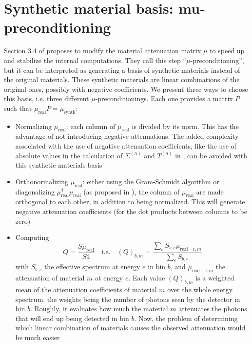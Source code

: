 \documentclass[a4paper, 10pt]{article}
\begin{document}
\section{Synthetic material basis: mu-preconditioning}
\label{sec:mu}
Section 3.4 of \cite{barber_algorithm_2016} proposes to modify the material attenuation matrix $\mu$ to speed up and stabilize the internal computations.
They call this step ``$\mu$-preconditioning'', but it can be interpreted as generating a basis of synthetic materials instead of the original materials.
These synthetic materials are linear combinations of the original ones, possibly with negative coefficients. We present three ways to choose this basis, i.e.
three different $\mu$-preconditionings. Each one provides a matrix $P$ such that $ \mu_{\text{real}} P = \mu_{\text{synth}}$:
\begin{itemize}
 \item Normalizing $\mu_{\text{real}}$: each column of $\mu_{\text{real}}$ is divided by its norm. This has the advantage of not introducing negative attenuations. 
 The added complexity associated with the use of negative attenuation coefficients, like the use of absolute values in the calculation of 
 $\Sigma^{(n)}$ and $T^{(n)}$ in \cite{barber_algorithm_2016}, can be avoided with this synthetic materials basis
 \item Orthonormalizing $\mu_{\text{real}}$: either using the Gram-Schmidt algorithm or diagonalizing $\mu_{\text{real}}^T \mu_{\text{real}}$ (as proposed in \cite{barber_algorithm_2016}), the column of $\mu_{\text{real}}$ are made 
 orthogonal to each other, in addition to being normalized. This will generate negative attenuation coefficients (for the dot products between columns to be zero)
 \item Computing
 \begin{equation*}
  Q = \frac{S \mu_{\text{real}}}{S \mathds{1}} \quad \text{i.e.} \quad \left( Q \right)_{b,m} = \frac{\sum_e S_{b,e} \mu_{\text{real} \quad e,m}}{\sum_e S_{b,e}}
 \end{equation*}
with $S_{b,e}$ the effective spectrum at energy $e$ in bin $b$, and $\mu_{\text{real} \quad e,m}$ the attenuation of material $m$ at energy $e$.
Each value $\left( Q \right)_{b,m} $ is a weighted mean of the attenuation coefficients of material $m$ over the whole energy spectrum, 
the weights being the number of photons seen by the detector in bin $b$. Roughly, it evaluates how much the material $m$ attenuates
the photons that will end up being detected in bin $b$. 
Now, the problem of determining which linear combination of materials causes the observed attenuation would be much easier 

\end{itemize}
\end{document}
